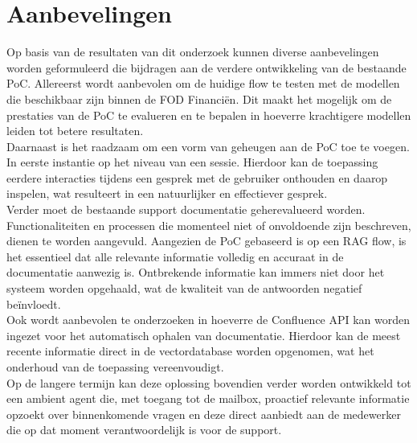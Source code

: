
\chapter{Aanbevelingen}
\label{ch:aanbevelingen}

Op basis van de resultaten van dit onderzoek kunnen diverse aanbevelingen worden geformuleerd die bijdragen aan de verdere ontwikkeling van de bestaande PoC.
Allereerst wordt aanbevolen om de huidige flow te testen met de modellen die beschikbaar zijn binnen de FOD Financiën. Dit maakt het mogelijk om de prestaties van de PoC te evalueren en te bepalen in hoeverre krachtigere modellen leiden tot betere resultaten.
\\[1em]
Daarnaast is het raadzaam om een vorm van geheugen aan de PoC toe te voegen. In eerste instantie op het niveau van een sessie. Hierdoor kan de toepassing eerdere interacties tijdens een gesprek met de gebruiker onthouden en daarop inspelen, wat resulteert in een natuurlijker en effectiever gesprek.
\\[1em]
Verder moet de bestaande support documentatie geherevalueerd worden. Functionaliteiten en processen die momenteel niet of onvoldoende zijn beschreven, dienen te worden aangevuld. Aangezien de PoC gebaseerd is op een RAG flow, is het essentieel dat alle relevante informatie volledig en accuraat in de documentatie aanwezig is. Ontbrekende informatie kan immers niet door het systeem worden opgehaald, wat de kwaliteit van de antwoorden negatief beïnvloedt.
\\[1em]
Ook wordt aanbevolen te onderzoeken in hoeverre de Confluence API kan worden ingezet voor het automatisch ophalen van documentatie. Hierdoor kan de meest recente informatie direct in de vectordatabase worden opgenomen, wat het onderhoud van de toepassing vereenvoudigt.
\\[1em]
Op de langere termijn kan deze oplossing bovendien verder worden ontwikkeld tot een ambient agent die, met toegang tot de mailbox, proactief relevante informatie opzoekt over binnenkomende vragen en deze direct aanbiedt aan de medewerker die op dat moment verantwoordelijk is voor de support.